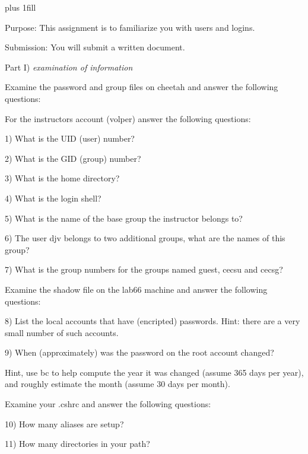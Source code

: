 
\rightskip=0pt plus 1fill

\parindent 0pt

Purpose: This assignment is to familiarize you with users and logins.

Submission: You will submit a written document.

Part I) {\it examination of information}

Examine the password and group files on {\ltt{}cheetah}
and answer the following questions:

For the instructors account ({\ltt{}volper}) answer the following
questions:

1) What is the UID (user) number?

2) What is the GID (group) number?

3) What is the home directory?

4) What is the login shell?

5) What is the name of the base group the instructor belongs to?

6) The user {\ltt{}djv} belongs to two additional groups,
what are the names of this group?

7) What is the group numbers for the groups named guest,
cecsu and cecsg?

Examine the shadow file on the {\ltt{}lab66} machine
and answer the following questions:

8) List the local accounts that have (encripted) passwords.
Hint: there are a very small number of such accounts.

9) When (approximately) was the password on the root account changed?

Hint, use bc to help compute the year it was changed (assume
365 days per year), and roughly estimate the month 
(assume 30 days per month).

Examine your {\ltt{}.cshrc} and answer the following questions:

10) How many aliases are setup?

11) How many directories in your path?

\bye
